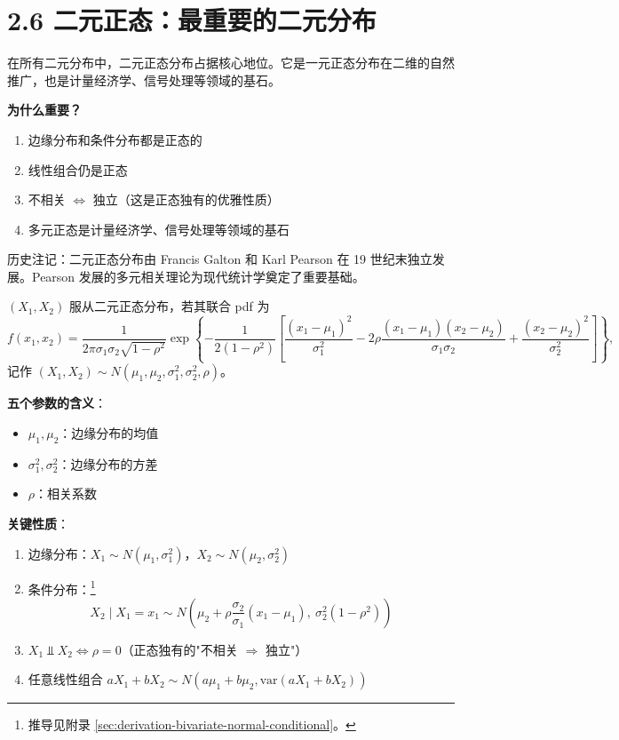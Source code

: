 \section{2.6 二元正态：最重要的二元分布}\label{sec:2.6}

在所有二元分布中，二元正态分布占据核心地位。它是一元正态分布在二维的自然推广，也是计量经济学、信号处理等领域的基石。

\textbf{为什么重要？}
\begin{enumerate}
\item 边缘分布和条件分布都是正态的
\item 线性组合仍是正态
\item 不相关 $\iff$ 独立（这是正态独有的优雅性质）
\item 多元正态是计量经济学、信号处理等领域的基石
\end{enumerate}

历史注记：二元正态分布由 Francis Galton 和 Karl Pearson 在 19 世纪末独立发展。Pearson 发展的多元相关理论为现代统计学奠定了重要基础。

\begin{definition}[二元正态分布]\label{def:bivariate-normal-ch2}
$(X_1, X_2)$ 服从二元正态分布，若其联合 pdf 为
\[
f(x_1, x_2) = \frac{1}{2\pi\sigma_1\sigma_2\sqrt{1-\rho^2}} \exp\left\{ -\frac{1}{2(1-\rho^2)} \left[ \frac{(x_1-\mu_1)^2}{\sigma_1^2} - 2\rho\frac{(x_1-\mu_1)(x_2-\mu_2)}{\sigma_1\sigma_2} + \frac{(x_2-\mu_2)^2}{\sigma_2^2} \right] \right\},
\]
记作 $(X_1, X_2) \sim N(\mu_1, \mu_2, \sigma_1^2, \sigma_2^2, \rho)$。
\end{definition}

\textbf{五个参数的含义}：
\begin{itemize}
\item $\mu_1, \mu_2$：边缘分布的均值
\item $\sigma_1^2, \sigma_2^2$：边缘分布的方差
\item $\rho$：相关系数
\end{itemize}

\textbf{关键性质}：

\begin{enumerate}
\item 边缘分布：$X_1 \sim N(\mu_1, \sigma_1^2)$，$X_2 \sim N(\mu_2, \sigma_2^2)$
\item 条件分布：\footnote{推导见附录 \cref{sec:derivation-bivariate-normal-conditional}。}
\begin{equation}\label{eq:bivariate-normal-conditional}
X_2 \mid X_1 = x_1 \sim N\left(\mu_2 + \rho\frac{\sigma_2}{\sigma_1}(x_1 - \mu_1), \ \sigma_2^2(1-\rho^2)\right)

\end{equation}
\item $X_1 \Perp X_2 \iff \rho = 0$（正态独有的"不相关 $\Rightarrow$ 独立"）
\item 任意线性组合 $aX_1 + bX_2 \sim N(a\mu_1 + b\mu_2, \text{var}(aX_1 + bX_2))$
\end{enumerate}

